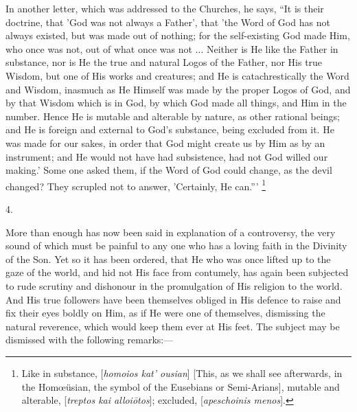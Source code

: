 In another letter, which was addressed to the Churches, he says,
``It is their doctrine, that 'God was not always a Father', that
'the Word of God has not always existed, but was made out of nothing;
for the self-existing God made Him, who once was not, out of what once
was not ... Neither is He like the Father in substance, nor is He the
true and natural Logos of the Father, nor His true Wisdom, but one of
His works and creatures; and He is catachrestically the Word and
Wisdom, inasmuch as He Himself was made by the proper Logos of God,
and by that Wisdom which is in God, by which God made all things, and
Him in the number. Hence He is mutable and alterable by nature, as
other rational beings; and He is foreign and external to God's
substance, being excluded from it. He was made for our sakes, in order
that God might create us by Him as by an instrument; and He would not
have had subsistence, had not God willed our making.' Some one asked
them, if the Word of God could change, as the devil changed? They
scrupled not to answer, 'Certainly, He can.''' \footnote{Like in substance, [\emph{homoios kat' ousian}]
[This, as we shall see afterwards, in the Homœüsian, the symbol of
the Eusebians or Semi-Arians], mutable and alterable, [\emph{treptos kai
alloi\={o}tos}]; excluded, [\emph{apeschoinis menos}].}

4.

More than enough has now been said in explanation of a controversy,
the very sound of which must be painful to any one who has a loving
faith in the Divinity of the Son. Yet so it has been ordered, that He
who was once lifted up to the gaze of the world, and hid not His face
from contumely, has again been subjected to rude scrutiny and
dishonour in the promulgation of His religion to the world. And His
true followers have been themselves obliged in His defence to raise
and fix their eyes boldly on Him, as if He were one of themselves,
dismissing the natural reverence, which would keep them ever at His
feet. The subject may be dismissed with the following remarks:—

